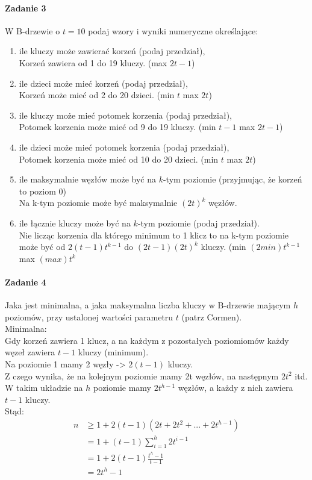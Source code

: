 \documentclass[18pt]{extarticle}
\begin{document}
\paragraph{Zadanie 3} W B-drzewie o $t=10$ podaj wzory i wyniki numeryczne określające:
\begin{enumerate}[label=(\alph*)]
    \item ile kluczy może zawierać korzeń (podaj przedział), \\
    Korzeń zawiera od 1 do 19 kluczy. (max $2t-1$)
    \item ile dzieci może mieć korzeń (podaj przedział), \\
    Korzeń może mieć od 2 do 20 dzieci. (min $t$ max $2t$)
    \item ile kluczy może mieć potomek korzenia (podaj przedział), \\
    Potomek korzenia może mieć od 9 do 19 kluczy. (min $t-1$ max $2t-1$)
    \item ile dzieci może mieć potomek korzenia (podaj przedział), \\
    Potomek korzenia może mieć od 10 do 20 dzieci. (min $t$ max $2t$)
    \item ile maksymalnie węzłów może być na $k$-tym poziomie (przyjmując, że korzeń to poziom $0$) \\
    Na k-tym poziomie może być maksymalnie $(2t)^k$ węzłów.
    \item ile łącznie kluczy może być na $k$-tym poziomie (podaj przedział). \\
    Nie licząc korzenia dla którego minimum to 1 klicz to na k-tym poziomie może być od $2(t-1)t^{k-1}$ do $(2t-1)(2t)^{k}$ kluczy. (min $(2min)t^{k-1}$ max $(max)t^{k}$
\end{enumerate}

\paragraph{Zadanie 4} Jaka jest minimalna, a jaka maksymalna liczba kluczy w B-drzewie mającym $h$ poziomów, przy ustalonej wartości parametru $t$ (patrz Cormen). \\

Minimalna: \\
Gdy korzeń zawiera 1 klucz, a na każdym z pozostałych poziomiomów każdy węzeł zawiera $t-1$ kluczy (minimum). \\
Na poziomie 1 mamy 2 węzły -> $2(t-1)$ kluczy. \\
Z czego wynika, że na kolejnym poziomie mamy 2t węzłów, na następnym $2t^2$ itd. \\
W takim układzie na $h$ poziomie mamy $2t^{h-1}$ węzłów, a każdy z nich zawiera $t-1$ kluczy. \\
Stąd: \\
\begin{align*}
    n &\geq 1 + 2(t-1)(2t + 2t^2 + ... + 2t^{h-1}) \\
    &= 1 + (t-1)\sum_{i=1}^{h}2t^{i-1} \\
    &= 1 + 2(t-1)\frac{t^h-1}{t-1} \\
    &= 2t^h - 1
\end{align*}
\end{document}
